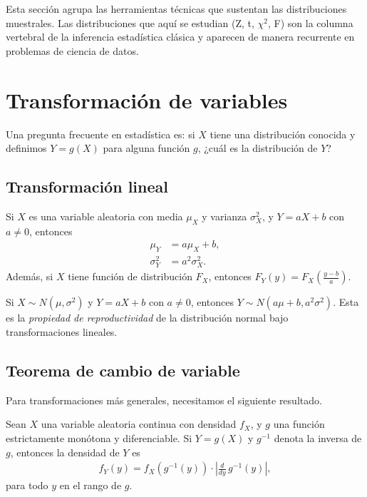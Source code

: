 
Esta secci\'on agrupa las herramientas t\'ecnicas que sustentan las distribuciones
muestrales. Las distribuciones que aqu\'i se estudian (Z, t, $\chi^2$, F) son la
columna vertebral de la inferencia estad\'istica cl\'asica y aparecen de manera
recurrente en problemas de ciencia de datos.


\section{Transformación de variables}

Una pregunta frecuente en estad\'istica es: si $X$ tiene una distribuci\'on conocida
y definimos $Y = g(X)$ para alguna funci\'on $g$, ¿cu\'al es la distribuci\'on de $Y$?

\subsection{Transformaci\'on lineal}

\begin{teorema}[Transformaci\'on af\'in]
Si $X$ es una variable aleatoria con media $\mu_X$ y varianza $\sigma_X^2$, y
$Y = aX + b$ con $a \neq 0$, entonces
\begin{align}
 \label{eq:3.2.1}
 \mu_Y &= a\mu_X + b, \\
 \label{eq:3.2.2}
 \sigma_Y^2 &= a^2\sigma_X^2.
\end{align}
Adem\'as, si $X$ tiene funci\'on de distribuci\'on $F_X$, entonces
$F_Y(y) = F_X\!\left(\frac{y-b}{a}\right)$.
\end{teorema}

\begin{ejemplo}
 \label{exmp:3.2.1}
Si $X \sim N(\mu, \sigma^2)$ y $Y = aX + b$ con $a \neq 0$, entonces
$Y \sim N(a\mu + b, a^2\sigma^2)$. Esta es la \emph{propiedad de reproductividad}
de la distribuci\'on normal bajo transformaciones lineales.
\end{ejemplo}

\subsection{Teorema de cambio de variable}

Para transformaciones m\'as generales, necesitamos el siguiente resultado.

\begin{teorema}
Sean $X$ una variable aleatoria continua con densidad $f_X$, y $g$ una funci\'on
estrictamente mon\'otona y diferenciable. Si $Y = g(X)$ y $g^{-1}$ denota la inversa
de $g$, entonces la densidad de $Y$ es
\begin{align}
 \label{eq:3.2.3}
 f_Y(y) = f_X\!\left(g^{-1}(y)\right) \cdot \left|\frac{d}{dy}\,g^{-1}(y)\right|,
\end{align}
para todo $y$ en el rango de $g$.
\end{teorema}

